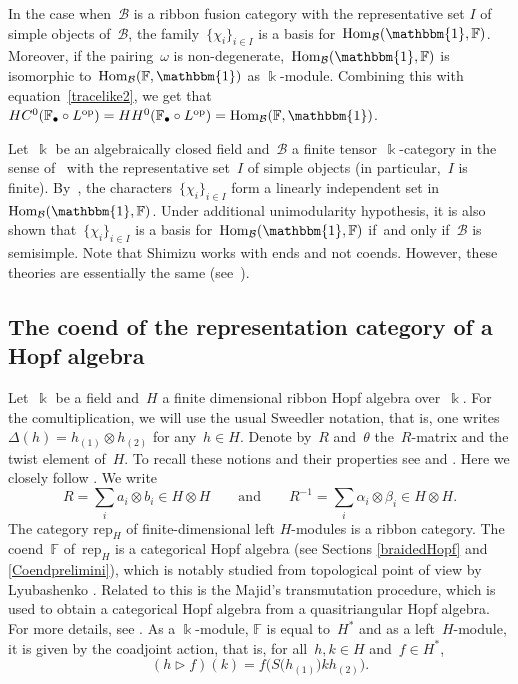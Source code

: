 \documentclass[10pt,a4paper]{amsart}
\numberwithin{equation}{section}
\newcommand{\tens}{\otimes}
\newcommand{\mc}{\mathcal}
\newcommand{\opp}{\mathrm{op}}
\newcommand{\Hom}{\mathrm{Hom}}
\newcommand{\kk}{\Bbbk}
\newcommand{\uu}{\mathbbm{1}}
\newcommand{\coend}{\mathbb{F}}
\newcommand{\rep}[1]{\text{rep}_{#1}}
\newcommand{\rtrn}{\triangleright}
\begin{document}
In the case when~$\mc B$ is a ribbon fusion category with the representative set $I$ of simple objects of~$\mc B$, the family~$\{\chi_i\}_{i\in I}$ is a basis for~$\Hom_{\mc B}(\uu,\coend)$.
Moreover, if the pairing~$\omega$ is non-degenerate,~$\Hom_{\mc B}(\uu,\coend)$ is isomorphic to~$\Hom_{\mc B}(\coend, \uu)$ as $\kk$-module. Combining this with equation~\eqref{tracelike2}, we get that $ HC^0(\coend_\bullet\circ L^\opp) = HH^0(\coend_\bullet\circ L^\opp) = \Hom_{\mc B}(\coend, \uu)$.

\begin{Remark}
Let~$\kk$ be an algebraically closed field and~$\mc B$ a finite tensor~$\kk$-category in the sense of~\cite{etingof-ostrik} with the representative set~$I$ of simple objects (in particular,~$I$ is finite). By~\cite[Theorem~4.1]{shimizu}, the characters~$\{\chi_i\}_{i\in I}$ form a linearly independent set in~$\Hom_{\mc B}(\uu, \coend)$. Under additional unimodularity hypothesis, it is also shown that~$\{\chi_i\}_{i\in I}$ is a basis for~$\Hom_{\mc B}(\uu, \coend)$ if~and only if~$\mc B$ is semisimple. Note that Shimizu works with ends and not coends. However, these theories are essentially the same (see~\cite[Remark 3.12]{shimizu}).
\end{Remark}

\subsection{The coend of the re\-pre\-senta\-tion ca\-te\-go\-ry of a Hopf al\-ge\-bra} \label{hopfexplicit}

Let~$\kk$ be a field and~$H$ a finite dimensional ribbon Hopf algebra over~$\kk$. For the comultiplication, we will use the usual Sweedler notation, that is, one writes~$\Delta(h)= h_{(1)}\tens h_{(2)}$ for any~$h\in H$. Denote by~$R$ and~$\theta$ the~$R$-matrix and the twist element of~$H$. To recall these notions and their properties see \cite{drinfeld1989almost} and \cite{reshetikhin1990ribbon}.
Here we closely follow \cite[Sections 4.2--4.6]{virelizier_2006}. We write
\[
R=\sum_i a_i \tens b_i \in H\tens H \qquad \text{and}\qquad R^{-1}=\sum_i \alpha_i\tens \beta_i \in H\tens H.
 \]
The category $\rep{H}$ of finite-dimensional left $H$-modules is a ribbon category. The coend~$\coend$ of~$\rep{H}$ is a categorical Hopf algebra (see Sections \ref{braidedHopf} and \ref{Coendprelimini}), which is notably studied from topological point of view by Lyubashenko \cite{lyubashenko1995invariants, lyubashenko1995tangles}. Related to this is the Majid's transmutation procedure, which is used to obtain a categorical Hopf algebra from a quasitriangular Hopf algebra. For more details, see \cite{majid1994algebras, majid2000foundations}.
As a $\kk$-module, $\coend$ is equal to~$H^*$ and as a left~$H$-module, it is given by the coadjoint action, that is, for all~$h,k\in H$ and~$f\in H^*$,
\[(h\rtrn f)(k)=f\bigl(S\bigl(h_{(1)}\bigr) k h_{(2)}\bigr).\]
\end{document}
